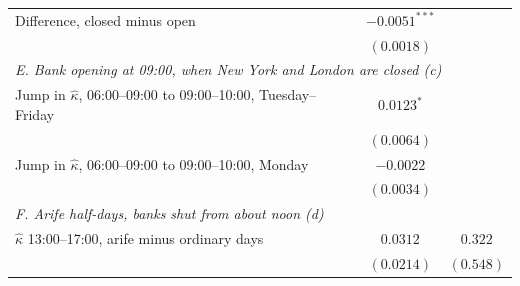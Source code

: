 \begin{tabular}{lcc}
\quad Difference, closed minus open & $-0.0051^{***}$ &  \\
 & $(0.0018)$ &  \\
\multicolumn{3}{l}{\emph{E. Bank opening at 09:00, when New York and London are closed (c)}} \\
\quad Jump in $\hat\kappa$, 06:00--09:00 to 09:00--10:00, Tuesday--Friday & $0.0123^{*}$ &  \\
 & $(0.0064)$ &  \\
\quad Jump in $\hat\kappa$, 06:00--09:00 to 09:00--10:00, Monday & $-0.0022$ &  \\
 & $(0.0034)$ &  \\
\multicolumn{3}{l}{\emph{F. Arife half-days, banks shut from about noon (d)}} \\
\quad $\hat\kappa$ 13:00--17:00, arife minus ordinary days & $0.0312$ & $0.322$ \\
 & $(0.0214)$ & $(0.548)$ \\
\bottomrule
\end{tabular}

